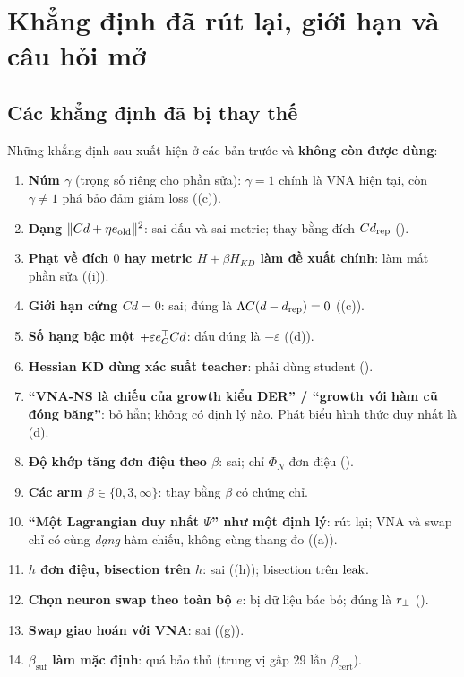 \section{Khẳng định đã rút lại, giới hạn và câu hỏi mở}\label{sec:limits}

\subsection{Các khẳng định đã bị thay thế}

Những khẳng định sau xuất hiện ở các bản trước và \textbf{không còn được dùng}:
\begin{enumerate}
\item \textbf{Núm $\gamma$} (trọng số riêng cho phần sửa): $\gamma=1$ chính là VNA hiện tại, còn $\gamma\ne1$ phá bảo đảm giảm loss ((c)).
\item \textbf{Dạng $\lVert Cd+\eta e_{\mathrm{old}}\rVert^2$}: sai dấu và sai metric; thay bằng đích $Cd_{\mathrm{rep}}$ ().
\item \textbf{Phạt về đích $0$ hay metric $H+\beta H_{KD}$ làm đề xuất chính}: làm mất phần sửa ((i)).
\item \textbf{Giới hạn cứng $Cd=0$}: sai; đúng là $\Lambda C(d-d_{\mathrm{rep}})=0$ ((c)).
\item \textbf{Số hạng bậc một $+\varepsilon e_O^{\top} Cd$}: dấu đúng là $-\varepsilon$ ((d)).
\item \textbf{Hessian KD dùng xác suất teacher}: phải dùng student ().
\item \textbf{``VNA-NS là chiếu của growth kiểu DER'' / ``growth với hàm cũ đóng băng''}: bỏ hẳn; không có định lý nào. Phát biểu hình thức duy nhất là (d).
\item \textbf{Độ khớp tăng đơn điệu theo $\beta$}: sai; chỉ $\Phi_N$ đơn điệu ().
\item \textbf{Các arm $\beta\in\{0,3,\infty\}$}: thay bằng $\beta$ có chứng chỉ.
\item \textbf{``Một Lagrangian duy nhất $\Psi$'' như một định lý}: rút lại; VNA và swap chỉ có cùng \emph{dạng} hàm chiếu, không cùng thang đo ((a)).
\item \textbf{$h$ đơn điệu, bisection trên $h$}: sai ((h)); bisection trên $\operatorname{leak}$.
\item \textbf{Chọn neuron swap theo toàn bộ $e$}: bị dữ liệu bác bỏ; đúng là $r_{\perp}$ ().
\item \textbf{Swap giao hoán với VNA}: sai ((g)).
\item \textbf{$\beta_{\mathrm{suf}}$ làm mặc định}: quá bảo thủ (trung vị gấp 29 lần $\beta_{\mathrm{cert}}$).

\end{enumerate}
